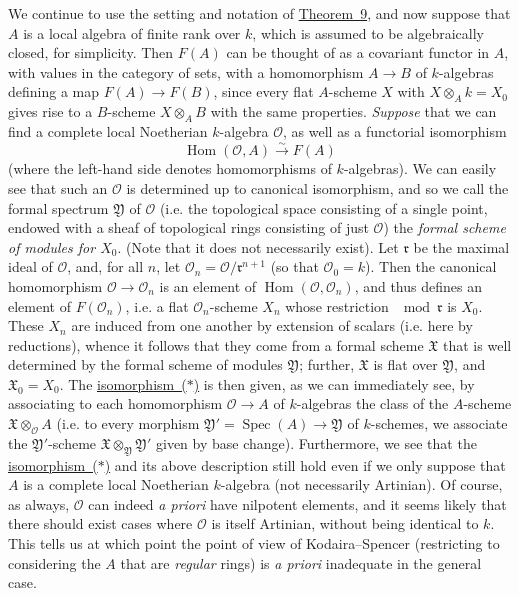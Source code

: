 \documentclass{article}
\newcommand{\scr}[1]{{\mathscr{#1}}}
\renewcommand{\cal}[1]{{\mathcal{#1}}}
\newcommand{\fk}{\mathfrak}
\DeclareMathOperator{\Spec}{Spec}
\DeclareMathOperator{\Hom}{Hom}
\begin{document}
We continue to use the setting and notation of \hyperref[theorem9]{Theorem~9}, and now suppose that $A$ is a local algebra of finite rank over $k$, which is assumed to be algebraically closed, for simplicity.
Then $F(A)$ can be thought of as a covariant functor in $A$, with values in the category of sets, with a homomorphism $A\to B$ of $k$-algebras defining a map $F(A)\to F(B)$, since every flat $A$-scheme $X$ with $X\otimes_Ak=X_0$ gives rise to a $B$-scheme $X\otimes_AB$ with the same properties.
\emph{Suppose} that we can find a complete local Noetherian $k$-algebra $\cal{O}$, as well as a functorial isomorphism
\[
  \label{isomorphism*}
  \Hom(\cal{O},A) \xrightarrow{\sim} F(A)
  \tag{$*$}
\]
(where the left-hand side denotes homomorphisms of $k$-algebras).
We can easily see that such an $\cal{O}$ is determined up to canonical isomorphism, and so we call the formal spectrum $\fk{Y}$ of $\cal{O}$ (i.e. the topological space consisting of a single point, endowed with a sheaf of topological rings consisting of just $\cal{O}$) the \emph{formal scheme of modules for $X_0$}.
(Note that it does not necessarily exist).
Let $\fk{r}$ be the maximal ideal of $\cal{O}$, and, for all $n$, let $\scr{O}_n=\cal{O}/\fk{r}^{n+1}$ (so that $\scr{O}_0=k$).
Then the canonical homomorphism $\cal{O}\to\scr{O}_n$ is an element of $\Hom(\cal{O},\scr{O}_n)$, and thus defines an element of $F(\scr{O}_n)$, i.e. a flat $\scr{O}_n$-scheme $X_n$ whose restriction $\mod\fk{r}$ is $X_0$.
These $X_n$ are induced from one another by extension of scalars (i.e. here by reductions), whence it follows that they come from a formal scheme $\fk{X}$ that is well determined by the formal scheme of modules $\fk{Y}$;
further, $\fk{X}$ is flat over $\fk{Y}$, and $\fk{X}_0=X_0$.
The \hyperref[isomorphism*]{isomorphism~($*$)} is then given, as we can immediately see, by associating to each homomorphism $\cal{O}\to A$ of $k$-algebras the class of the $A$-scheme $\fk{X}\otimes_{\cal{O}} A$ (i.e. to every morphism $\fk{Y}'=\Spec(A)\to\fk{Y}$ of $k$-schemes, we associate the $\fk{Y}'$-scheme $\fk{X}\otimes_{\fk{Y}}\fk{Y}'$ given by base change).
Furthermore, we see that the \hyperref[isomorphism*]{isomorphism~($*$)} and its above description still hold even if we only suppose that $A$ is a complete local Noetherian $k$-algebra (not necessarily Artinian).
Of course, as always, $\cal{O}$ can indeed \emph{a priori} have nilpotent elements, and it seems likely that there should exist cases where $\cal{O}$ is itself Artinian, without being identical to $k$.
This tells us at which point the point of view of Kodaira--Spencer (restricting to considering the $A$ that are \emph{regular} rings) is \emph{a priori} inadequate in the general case.
\end{document}
